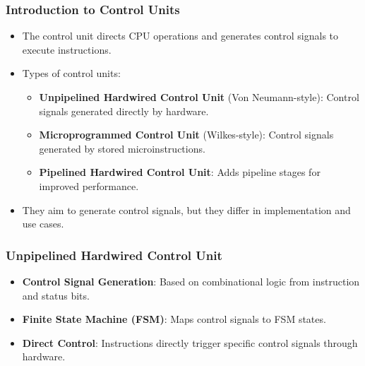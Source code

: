 \begin{frame}
    \frametitle{Introduction to Control Units}
    \begin{itemize}
        \item The control unit directs CPU operations and generates control signals to execute instructions.
        \item Types of control units:
            \begin{itemize}
                \item \textbf{Unpipelined Hardwired Control Unit} (Von Neumann-style): Control signals generated directly by hardware.
                \item \textbf{Microprogrammed Control Unit} (Wilkes-style): Control signals generated by stored microinstructions.
                \item \textbf{Pipelined Hardwired Control Unit}: Adds pipeline stages for improved performance.
            \end{itemize}
        \item They aim to generate control signals,
        but they differ in implementation and use cases.
    \end{itemize}
\end{frame}

\begin{frame}
    \frametitle{Unpipelined Hardwired Control Unit}
    \begin{itemize}
        \item \textbf{Control Signal Generation}: Based on combinational logic from instruction and status bits.
        \item \textbf{Finite State Machine (FSM)}: Maps control signals to FSM states.
        \item \textbf{Direct Control}: Instructions directly trigger specific control signals through hardware.
    \end{itemize}
\end{frame}

